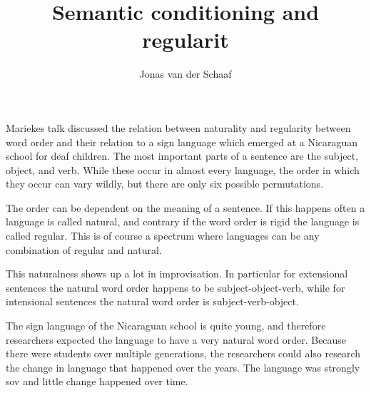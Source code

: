 \documentclass{article}
\title{Semantic conditioning and regularit}
\author{Jonas van der Schaaf}
\date{}
\begin{document}
\maketitle

Mariekes talk discussed the relation between naturality and regularity between
word order and their relation to a sign language which emerged at a Nicaraguan
school for deaf children. The most important parts of a sentence are the
subject, object, and verb. While these occur in almost every language, the order
in which they occur can vary wildly, but there are only six possible
permutations.

The order can be dependent on the meaning of a sentence. If this happens often a
language is called natural, and contrary if the word order is rigid the language
is called regular. This is of course a spectrum where languages can be any
combination of regular and natural.

This naturalness shows up a lot in improvisation. In particular for extensional
sentences the natural word order happens to be subject-object-verb, while for
intensional sentences the natural word order is subject-verb-object.

The sign language of the Nicaraguan school is quite young, and therefore
researchers expected the language to have a very natural word order. Because
there were students over multiple generations, the researchers could also
research the change in language that happened over the years. The language was
strongly sov and little change happened over time.
\end{document}
